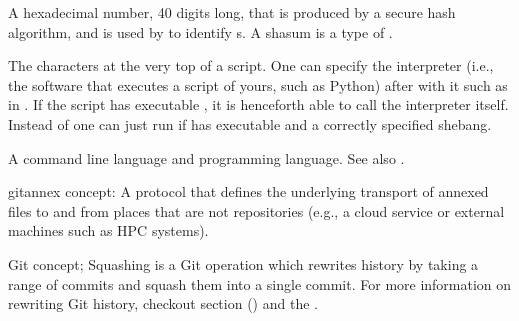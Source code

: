 \begin{description}
\sphinxAtStartPar
A hexadecimal number, 40 digits long, that is produced by a secure hash algorithm, and
is used by {\hyperref[\detokenize{glossary:term-Git}]{}} to identify {\hyperref[\detokenize{glossary:term-commit}]{}}s. A shasum is a type of {\hyperref[\detokenize{glossary:term-checksum}]{}}.

\sphinxAtStartPar
The characters \sphinxcode{\sphinxupquote{\#!}} at the very top of a script. One can specify the interpreter (i.e., the
software that executes a script of yours, such as Python) after with it such as in
.
If the script has executable {\hyperref[\detokenize{glossary:term-permissions}]{}}, it is henceforth able to call the interpreter itself.
Instead of  one can just run  if  has
executable {\hyperref[\detokenize{glossary:term-permissions}]{}} and a correctly specified shebang.

\sphinxAtStartPar
A command line language and programming language. See also {\hyperref[\detokenize{glossary:term-terminal}]{}}.

\sphinxAtStartPar
git\sphinxhyphen{}annex concept: A protocol that defines the underlying transport of annexed files
to and from places that are not {\hyperref[\detokenize{glossary:term-Git}]{}} repositories (e.g., a cloud service or
external machines such as HPC systems).

\ignorespaces 
\sphinxAtStartPar
Git concept; Squashing is a Git operation which rewrites history by taking
a range of commits and squash them into a single commit. For more information
on rewriting Git history, checkout section {\hyperref[\detokenize{basics/101-137-history:history}]{}} () and the
.


\end{description}
